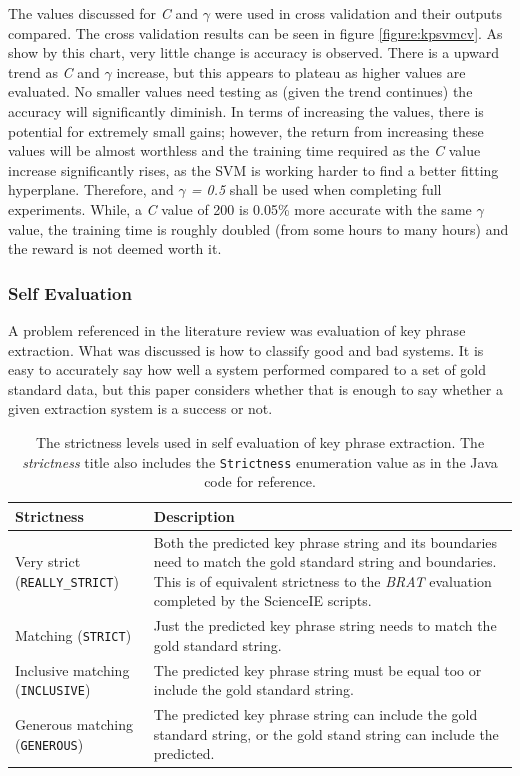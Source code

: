 The values discussed for \textit{C} and $\gamma$ were used in cross validation and their outputs compared. The cross validation results can be seen in figure \ref{figure:kpsvmcv}. As show by this chart, very little change is accuracy is observed. There is a upward trend as \textit{C} and $\gamma$ increase, but this appears to plateau as higher values are evaluated. No smaller values need testing as (given the trend continues) the accuracy will significantly diminish. In terms of increasing the values, there is potential for extremely small gains; however, the return from increasing these values will be almost worthless and the training time required as the \textit{C} value increase significantly rises, as the SVM is working harder to find a better fitting hyperplane. Therefore,  and \textit{$\gamma$ = 0.5} shall be used when completing full experiments. While, a \textit{C} value of 200 is 0.05\% more accurate with the same $\gamma$ value, the training time is roughly doubled (from some hours to many hours) and the reward is not deemed worth it.

\subsubsection*{Self Evaluation}
A problem referenced in the literature review was evaluation of key phrase extraction. What was discussed is how to classify good and bad systems. It is easy to accurately say how well a system performed compared to a set of gold standard data, but this paper considers whether that is enough to say whether a given extraction system is a success or not.


\begin{table}
	\centering
	\begin{tabular}{ C{3cm} | C{10cm} }
		\textbf{Strictness} & \textbf{Description} \\
		\hline
		Very strict (\texttt{REALLY\_STRICT}) & Both the predicted key phrase string and its boundaries need to match the gold standard string and boundaries. This is of equivalent strictness to the \textit{BRAT} evaluation completed by the ScienceIE scripts. \\
		\hline
		Matching (\texttt{STRICT}) & Just the predicted key phrase string needs to match the gold standard string. \\
		\hline
		Inclusive matching (\texttt{INCLUSIVE}) & The predicted key phrase string must be equal too or include the gold standard string. \\
		\hline
		Generous matching (\texttt{GENEROUS}) & The predicted key phrase string can include the gold standard string, or the gold stand string can include the predicted. \\
	\end{tabular}
	\caption[Strictness Descriptions for Self Evaluation of Key Phrases]{The strictness levels used in self evaluation of key phrase extraction. The \textit{strictness} title also includes the \texttt{Strictness} enumeration value as in the Java code for reference.}
	\label{table:strictness}
\end{table}

